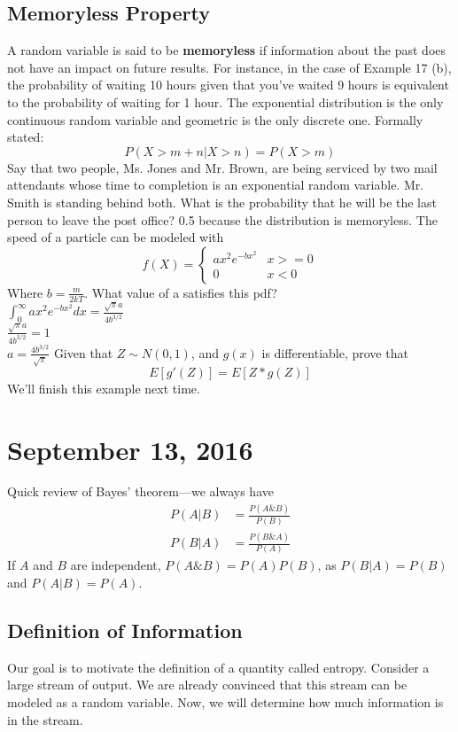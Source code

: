 \documentclass[11pt]{article}
\theoremstyle{definition}
\begin{document}
\subsection{Memoryless Property}
A random variable is said to be {\bf memoryless} if information about the past does not have an impact on future results. For instance, in the case of Example 17 (b), the probability of waiting 10 hours given that you've waited 9 hours is equivalent to the probability of waiting for 1 hour. The exponential distribution is the only continuous random variable and geometric is the only discrete one. Formally stated:\\
$$P(X > m + n | X > n) = P(X > m)$$
\example Say that two people, Ms. Jones and Mr. Brown, are being serviced by two mail attendants whose time to completion is an exponential random variable. Mr. Smith is standing behind both. What is the probability that he will be the last person to leave the post office? 0.5 because the distribution is memoryless. 
\example The speed of a particle can be modeled with \begin{equation*} f(X) =	 \begin{cases}
								a x^2 e^{-b x^2} & x >= 0\\
								0 & x < 0
							\end{cases}
		\end{equation*}
		Where $b = \frac{m}{2kT}$. What value of a satisfies this pdf?\\
		$\int_{0}^{\infty} a x^2 e^{-b x^2} dx = \frac{\sqrt{\pi } a}{4 b^{3/2}} $\\
		$\frac{\sqrt{\pi } a}{4 b^{3/2}} = 1$\\
		$a = \frac{4 b^{3/2}}{\sqrt{\pi }}$
\example Given that $Z \sim N(0,1)$, and $g(x)$ is differentiable, prove that
$$E[g'(Z)] = E[Z * g(Z)]$$
We'll finish this example next time. 

\section{September 13, 2016}

Quick review of Bayes' theorem---we always have
\begin{align*}
P(A|B) &= \frac{P(A \& B)}{P(B)} \\
P(B|A) &= \frac{P(B \& A)}{P(A)} 
\end{align*}
If $A$ and $B$ are independent, $P(A \& B) = P(A) P(B)$, as $P(B | A) = P(B)$ and $P(A | B) = P(A)$. 

\subsection{Definition of Information} 
Our goal is to motivate the definition of a quantity called entropy. Consider a large stream of output. We are already convinced that this stream can be modeled as a random variable. Now, we will determine how much information is in the stream. 
\end{document}
